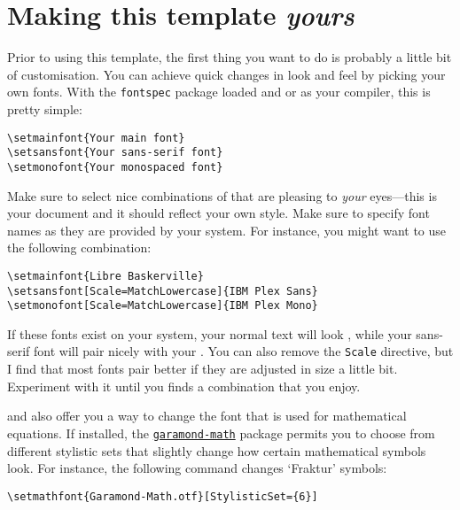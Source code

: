 \section{Making this template \emph{yours}}

Prior to using this template, the first thing you want to do is probably
a little bit of customisation. You can achieve quick changes in look and
feel by picking your own fonts. With the \verb|fontspec| package loaded
and  \XeLaTeX or \LuaLaTeX as your compiler, this is pretty simple:
%
\begin{verbatim}
\setmainfont{Your main font}
\setsansfont{Your sans-serif font}
\setmonofont{Your monospaced font}
\end{verbatim}
%
Make sure to select nice combinations of that are pleasing to
\emph{your} eyes---this is your document and it should reflect your own
style. Make sure to specify font names as they are provided by your
system. For instance, you might want to use the following combination:
%
\begin{verbatim}
\setmainfont{Libre Baskerville}
\setsansfont[Scale=MatchLowercase]{IBM Plex Sans}
\setmonofont[Scale=MatchLowercase]{IBM Plex Mono}
\end{verbatim}
%
\ifxetexorluatex
If these fonts exist on your system, your normal text will look
{}, while your sans-serif font {will 
pair nicely with your} {}.
%
You can also remove the \verb|Scale| directive, but I find that most
fonts pair better if they are adjusted in size a little bit. Experiment
with it until you finds a combination that you enjoy.
\fi

\XeLaTeX and \LuaLaTeX also offer you a way to change the font that is
used for mathematical equations. If installed, the
\href{https://ctan.org/pkg/garamond-math}{\texttt{garamond-math}}
package permits you to choose from different stylistic sets that
slightly change how certain mathematical symbols look. For instance, the
following command changes `Fraktur' symbols:
%
\begin{verbatim}
\setmathfont{Garamond-Math.otf}[StylisticSet={6}]
\end{verbatim}

